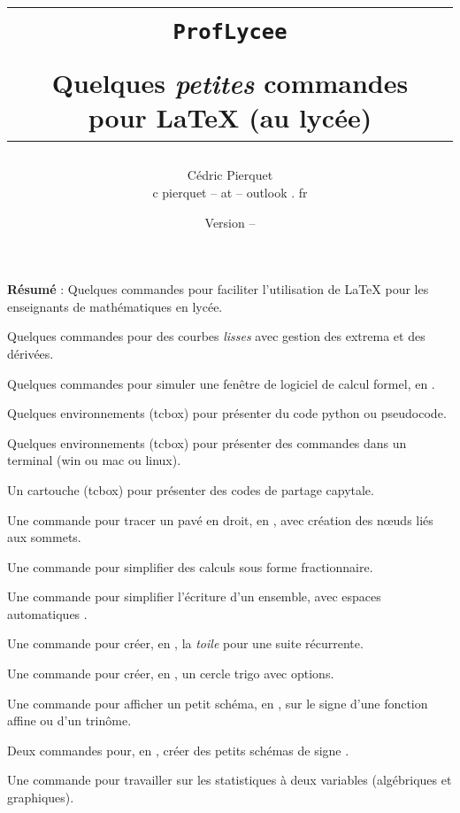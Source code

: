 \documentclass{article}
\title{%
\begin{minipage}{0.75\linewidth}
	\begin{tcolorbox}[colframe=yellow,colback=yellow!15]
		\begin{center}
			\begin{tabular}{c}
				\lstinline!ProfLycee!\\
				\\
				Quelques \textit{petites} commandes pour  \LaTeX{} (au lycée)
			\end{tabular}
		\end{center}
	\end{tcolorbox}
\end{minipage}
}
\author{
	\begin{tabular}{c}
		Cédric Pierquet\\
		{\ttfamily c pierquet -- at -- outlook . fr}
	\end{tabular}
}
\date{Version \PLversion{} -- \PLdate}
\begin{document}

\pagestyle{fancy}

\maketitle

\thispagestyle{empty}

{\Large {\bfseries Résumé} : Quelques commandes pour faciliter l'utilisation de \LaTeX{} pour les enseignants de mathématiques en lycée.}

\medskip

\noindent Quelques commandes pour des courbes \textit{lisses} avec gestion des extrema et des dérivées.

Quelques commandes pour simuler une fenêtre de logiciel de calcul formel, en \TikZ.

Quelques environnements (\textsf{tcbox}) pour présenter du code \textsf{python} ou \textsf{pseudocode}.

Quelques environnements (\textsf{tcbox}) pour présenter des commandes dans un terminal (\textsf{win} ou \textsf{mac} ou \textsf{linux}).

Un cartouche (\textsf{tcbox}) pour présenter des codes de partage \textsf{capytale}.

Une commande pour tracer un pavé en droit, en \TikZ, avec création des nœuds liés aux sommets.

Une commande pour simplifier des calculs sous forme fractionnaire.

Une commande pour simplifier l'écriture d'un ensemble, avec espaces \og automatiques \fg.

Une commande pour créer, en \TikZ, la \textit{toile} pour une suite récurrente.

Une commande pour créer, en \TikZ, un cercle trigo avec options.

Une commande pour afficher un petit schéma, en \TikZ, sur le signe d'une fonction affine ou d'un trinôme.

Deux commandes pour, en \TikZ, créer des petits schémas \og de signe \fg.

Une commande pour travailler sur les statistiques à deux variables (algébriques et graphiques).
\end{document}

